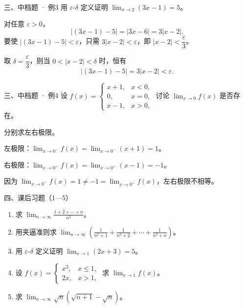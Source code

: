 \documentclass[aspectratio=169,11pt]{beamer}
\begin{document}
\begin{frame}{三、中档题 · 例3}
 用 $\varepsilon$-$\delta$ 定义证明 $\displaystyle\lim_{x\to 2}(3x-1)=5$。

 对任意 $\varepsilon>0$，
\[
|(3x-1)-5|=|3x-6|=3|x-2|.
\]
要使 $|(3x-1)-5|<\varepsilon$，只需 $3|x-2|<\varepsilon$，即 $|x-2|<\dfrac{\varepsilon}{3}$。

取 $\delta=\dfrac{\varepsilon}{3}$，则当 $0<|x-2|<\delta$ 时，恒有
\[
|(3x-1)-5|=3|x-2|<\varepsilon.
\]

\end{frame}

\begin{frame}{三、中档题 · 例4}
 设 $f(x)=\begin{cases}x+1, & x<0,\\ 0, & x=0,\\ x-1, & x>0,\end{cases}$ 讨论 $\displaystyle\lim_{x\to 0}f(x)$ 是否存在。

 分别求左右极限。

左极限：$\displaystyle\lim_{x\to 0^-}f(x)=\lim_{x\to 0^-}(x+1)=1$。

右极限：$\displaystyle\lim_{x\to 0^+}f(x)=\lim_{x\to 0^+}(x-1)=-1$。

因为 $\displaystyle\lim_{x\to 0^-}f(x)=1\ne -1=\lim_{x\to 0^+}f(x)$，左右极限不相等。


\end{frame}

\begin{frame}{四、课后习题（1—5）}
\begin{enumerate}
  \item 求 $\displaystyle\lim_{n\to\infty}\frac{1+2+\cdots+n}{n^2}$。
  \item 用夹逼准则求 $\displaystyle\lim_{n\to\infty}\left(\frac1{n^2+1}+\frac1{n^2+2}+\cdots+\frac1{n^2+n}\right)$。
  \item 用 $\varepsilon$-$\delta$ 定义证明 $\displaystyle\lim_{x\to 1}(2x+3)=5$。
  \item 设 $f(x)=\begin{cases}x^2, & x\le 1,\\ 2x, & x>1,\end{cases}$ 求 $\displaystyle\lim_{x\to 1}f(x)$。
  \item 求 $\displaystyle\lim_{n\to\infty}\sqrt{n}(\sqrt{n+1}-\sqrt{n})$。
\end{enumerate}
\end{frame}
\end{document}
